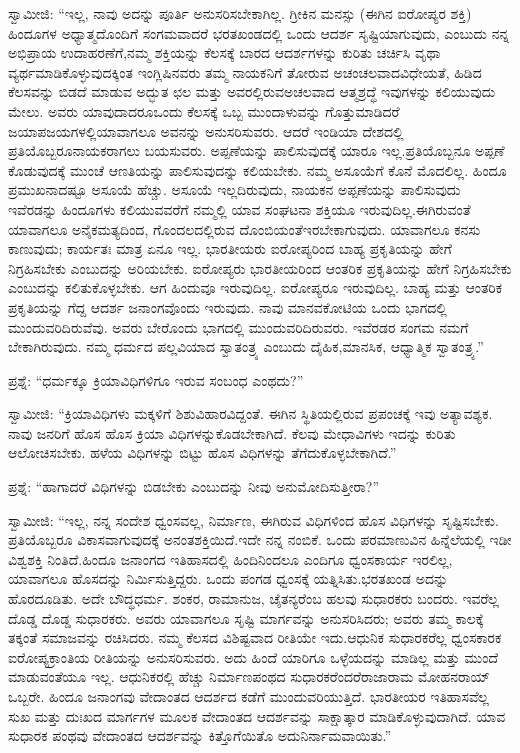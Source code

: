 ಸ್ವಾಮೀಜಿ: “ಇಲ್ಲ, ನಾವು ಅದನ್ನು ಪೂರ್ತಿ ಅನುಸರಿಸಬೇಕಾಗಿಲ್ಲ. ಗ್ರೀಕಿನ ಮನಸ್ಸು (ಈಗಿನ ಐರೋಪ್ಯರ ಶಕ್ತಿ) ಹಿಂದೂಗಳ ಅಧ್ಯಾತ್ಮದೊಂದಿಗೆ ಸಂಗಮವಾದರೆ ಭರತಖಂಡದಲ್ಲಿ ಒಂದು ಆದರ್ಶ ಸೃಷ್ಟಿಯಾಗುವುದು, ಎಂಬುದು ನನ್ನ ಅಭಿಪ್ರಾಯ ಉದಾಹರಣೆಗೆ,\break ನಮ್ಮ ಶಕ್ತಿಯನ್ನು ಕೆಲಸಕ್ಕೆ ಬಾರದ ಆದರ್ಶಗಳನ್ನು ಕುರಿತು ಚರ್ಚಿಸಿ ವೃಥಾ ವ್ಯರ್ಥಮಾಡಿ\-ಕೊಳ್ಳುವುದಕ್ಕಿಂತ ಇಂಗ್ಲಿಷಿನವರು ತಮ್ಮ ನಾಯಕನಿಗೆ ತೋರುವ ಅಚಂಚಲವಾದ\break ವಿಧೇಯತೆ, ಹಿಡಿದ ಕೆಲಸವನ್ನು ಬಿಡದೆ ಮಾಡುವ ಅದ್ಭುತ ಛಲ ಮತ್ತು ಅವರಲ್ಲಿರುವ\break ಅಚಲವಾದ ಆತ್ಮಶ್ರದ್ಧೆ ಇವುಗಳನ್ನು ಕಲಿಯುವುದು ಮೇಲು. ಅವರು ಯಾವುದಾದರೂ\break ಒಂದು ಕೆಲಸಕ್ಕೆ ಒಬ್ಬ ಮುಂದಾಳುವನ್ನು ಗೊತ್ತುಮಾಡಿದರೆ ಜಯಾಪಜಯಗಳಲ್ಲಿ\break ಯಾವಾಗಲೂ ಅವನನ್ನು ಅನುಸರಿಸುವರು. ಆದರೆ ಇಂಡಿಯಾ ದೇಶದಲ್ಲಿ ಪ್ರತಿಯೊಬ್ಬರೂ\break ನಾಯಕರಾಗಲು ಬಯಸುವರು. ಅಪ್ಪಣೆಯನ್ನು ಪಾಲಿಸುವುದಕ್ಕೆ ಯಾರೂ ಇಲ್ಲ.\break ಪ್ರತಿಯೊಬ್ಬನೂ ಅಪ್ಪಣೆ ಕೊಡುವುದಕ್ಕೆ ಮುಂಚೆ ಆಣತಿಯನ್ನು ಪಾಲಿಸುವುದನ್ನು ಕಲಿಯಬೇಕು. ನಮ್ಮ ಅಸೂಯೆಗೆ ಕೊನೆ ಮೊದಲಿಲ್ಲ. ಹಿಂದೂ ಪ್ರಮುಖನಾದಷ್ಟೂ ಅಸೂಯೆ ಹೆಚ್ಚು. ಅಸೂಯೆ ಇಲ್ಲದಿರುವುದು, ನಾಯಕನ ಅಪ್ಪಣೆಯನ್ನು ಪಾಲಿಸುವುದು ಇವೆರಡನ್ನು ಹಿಂದೂಗಳು ಕಲಿಯುವವರೆಗೆ ನಮ್ಮಲ್ಲಿ ಯಾವ ಸಂಘಟನಾ ಶಕ್ತಿಯೂ ಇರುವುದಿಲ್ಲ.\break ಈಗಿರುವಂತೆ ಯಾವಾಗಲೂ ಅನೈಕಮತ್ಯದಿಂದ, ಗೊಂದಲದಲ್ಲಿರುವ ದೊಂಬಿಯಂತೆ\break ಇರಬೇಕಾಗುವುದು. ಯಾವಾಗಲೂ ಕನಸು ಕಾಣುವುದು; ಕಾರ್ಯತಃ ಮಾತ್ರ ಏನೂ ಇಲ್ಲ. ಭಾರತೀಯರು ಐರೋಪ್ಯರಿಂದ ಬಾಹ್ಯ ಪ್ರಕೃತಿಯನ್ನು ಹೇಗೆ ನಿಗ್ರಹಿಸಬೇಕು ಎಂಬುದನ್ನು ಅರಿಯಬೇಕು. ಐರೋಪ್ಯರು ಭಾರತೀಯರಿಂದ ಆಂತರಿಕ ಪ್ರಕೃತಿಯನ್ನು ಹೇಗೆ ನಿಗ್ರಹಿಸಬೇಕು ಎಂಬುದನ್ನು ಕಲಿತುಕೊಳ್ಳಬೇಕು. ಆಗ ಹಿಂದುವೂ ಇರುವುದಿಲ್ಲ. ಐರೋಪ್ಯರೂ ಇರುವುದಿಲ್ಲ. ಬಾಹ್ಯ ಮತ್ತು ಆಂತರಿಕ ಪ್ರಕೃತಿಯನ್ನು ಗೆದ್ದ ಆದರ್ಶ ಜನಾಂಗವೊಂದು ಇರುವುದು. ನಾವು ಮಾನವಕೋಟಿಯ ಒಂದು ಭಾಗದಲ್ಲಿ ಮುಂದುವರಿದಿರುವೆವು. ಅವರು ಬೇರೊಂದು ಭಾಗದಲ್ಲಿ ಮುಂದುವರಿದಿರುವರು. ಇವೆರಡರ ಸಂಗಮ ನಮಗೆ ಬೇಕಾಗಿರುವುದು. ನಮ್ಮ ಧರ್ಮದ ಪಲ್ಲವಿಯಾದ ಸ್ವಾತಂತ್ರ್ಯ ಎಂಬುದು ದೈಹಿಕ,\break ಮಾನಸಿಕ, ಆಧ್ಯಾತ್ಮಿಕ ಸ್ವಾತಂತ್ರ್ಯ.”

\vskip 0.1cm

ಪ್ರಶ್ನೆ: “ಧರ್ಮಕ್ಕೂ ಕ್ರಿಯಾವಿಧಿಗಳಿಗೂ ಇರುವ ಸಂಬಂಧ ಎಂಥದು?”

\vskip 0.1cm

ಸ್ವಾಮೀಜಿ: “ಕ್ರಿಯಾವಿಧಿಗಳು ಮಕ್ಕಳಿಗೆ ಶಿಶುವಿಹಾರವಿದ್ದಂತೆ. ಈಗಿನ ಸ್ಥಿತಿಯಲ್ಲಿರುವ ಪ್ರಪಂಚಕ್ಕೆ ಇವು ಅತ್ಯಾವಶ್ಯಕ. ನಾವು ಜನರಿಗೆ ಹೊಸ ಹೊಸ ಕ್ರಿಯಾ ವಿಧಿಗಳನ್ನು\break ಕೊಡಬೇಕಾಗಿದೆ. ಕೆಲವು ಮೇಧಾವಿಗಳು ಇದನ್ನು ಕುರಿತು ಆಲೋಚಿಸಬೇಕು. ಹಳೆಯ ವಿಧಿಗಳನ್ನು ಬಿಟ್ಟು ಹೊಸ ವಿಧಿಗಳನ್ನು ತೆಗೆದುಕೊಳ್ಳಬೇಕಾಗಿದೆ.”

\vskip 0.1cm

ಪ್ರಶ್ನೆ: “ಹಾಗಾದರೆ ವಿಧಿಗಳನ್ನು ಬಿಡಬೇಕು ಎಂಬುದನ್ನು ನೀವು ಅನುಮೋದಿಸು\-ತ್ತೀರಾ?”

\vskip 0.1cm

ಸ್ವಾಮೀಜಿ: “ಇಲ್ಲ, ನನ್ನ ಸಂದೇಶ ಧ್ವಂಸವಲ್ಲ, ನಿರ್ಮಾಣ, ಈಗಿರುವ ವಿಧಿಗಳಿಂದ ಹೊಸ ವಿಧಿಗಳನ್ನು ಸೃಷ್ಟಿಸಬೇಕು. ಪ್ರತಿಯೊಬ್ಬರೂ ವಿಕಾಸವಾಗುವುದಕ್ಕೆ ಅನಂತಶಕ್ತಿಯಿದೆ.\break ಇದೇ ನನ್ನ ನಂಬಿಕೆ. ಒಂದು ಪರಮಾಣುವಿನ ಹಿನ್ನೆಲೆಯಲ್ಲಿ ಇಡೀ ವಿಶ್ವಶಕ್ತಿ ನಿಂತಿದೆ.\break ಹಿಂದೂ ಜನಾಂಗದ ಇತಿಹಾಸದಲ್ಲಿ ಹಿಂದಿನಿಂದಲೂ ಎಂದಿಗೂ ಧ್ವಂಸಕಾರ್ಯ ಇರಲಿಲ್ಲ, ಯಾವಾಗಲೂ ಹೊಸದನ್ನು ನಿರ್ಮಿಸುತ್ತಿದ್ದರು. ಒಂದು ಪಂಗಡ ಧ್ವಂಸಕ್ಕೆ ಯತ್ನಿಸಿತು.\break ಭರತಖಂಡ ಅದನ್ನು ಹೊರದೂಡಿತು. ಅದೇ ಬೌದ್ಧಧರ್ಮ. ಶಂಕರ, ರಾಮಾನುಜ, ಚೈತನ್ಯರೆಂಬ ಹಲವು ಸುಧಾರಕರು ಬಂದರು. ಇವರೆಲ್ಲ ದೊಡ್ಡ ದೊಡ್ಡ ಸುಧಾರಕರು. ಅವರು ಯಾವಾಗಲೂ ಸೃಷ್ಟಿ ಮಾರ್ಗವನ್ನು ಅನುಸರಿಸಿದರು; ಅವರು ತಮ್ಮ ಕಾಲಕ್ಕೆ ತಕ್ಕಂತೆ ಸಮಾಜವನ್ನು ರಚಿಸಿದರು. ನಮ್ಮ ಕೆಲಸದ ವಿಶಿಷ್ಟವಾದ ರೀತಿಯೇ ಇದು.\break ಆಧುನಿಕ ಸುಧಾರಕರೆಲ್ಲ ಧ್ವಂಸಕಾರಕ ಐರೋಪ್ಯಕ್ರಾಂತಿಯ ರೀತಿಯನ್ನು ಅನುಸರಿಸುವರು. ಅದು ಹಿಂದೆ ಯಾರಿಗೂ ಒಳ್ಳೆಯದನ್ನು ಮಾಡಿಲ್ಲ ಮತ್ತು ಮುಂದೆ ಮಾಡುವಂತೆಯೂ ಇಲ್ಲ. ಆಧುನಿಕರಲ್ಲಿ ಹೆಚ್ಚು ನಿರ್ಮಾಣಪಂಥದ ಸುಧಾರಕರೆಂದರೆ\break ರಾಜಾರಾಮ ಮೋಹನರಾಯ್​ ಒಬ್ಬರೇ. ಹಿಂದೂ ಜನಾಂಗವು ವೇದಾಂತದ ಆದರ್ಶದ ಕಡೆಗೆ ಮುಂದುವರಿಯುತ್ತಿದೆ. ಭಾರತೀಯರ ಇತಿಹಾಸವೆಲ್ಲ ಸುಖ ಮತ್ತು ದುಃಖದ ಮಾರ್ಗಗಳ ಮೂಲಕ ವೇದಾಂತದ ಆದರ್ಶವನ್ನು ಸಾಕ್ಷಾತ್ಕಾರ ಮಾಡಿಕೊಳ್ಳುವುದಾಗಿದೆ. ಯಾವ ಸುಧಾರಕ ಪಂಥವು ವೇದಾಂತದ ಆದರ್ಶವನ್ನು ಕಿತ್ತೊಗೆಯಿತೊ ಅದು\break ನಿರ್ನಾಮವಾಯಿತು.”

